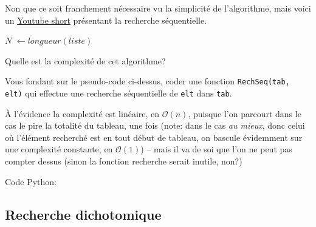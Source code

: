\documentclass[12pt]{article}
\begin{document}
	\begin{MaVid}
		Non que ce soit franchement nécessaire vu la simplicité de l'algorithme, mais voici un \href{https://youtu.be/D7sMvXltMiU}{Youtube short} présentant la recherche séquentielle.
	\end{MaVid}
	
	
	
	\begin{MaReponse}
		\begin{algorithmic}[1]
			\State $N$ $\leftarrow longueur(liste)$
			\State{}
			\EndIf
			\EndFor
			\State{}
			\EndFunction
		\end{algorithmic}
	\end{MaReponse}
		
	\begin{MonExo}
		\begin{alphenum}
			\item Quelle est la complexité de cet algorithme?
			\item Vous fondant sur le pseudo-code ci-dessus, coder une fonction \texttt{RechSeq(tab, elt)} qui effectue une recherche séquentielle de \texttt{elt} dans \texttt{tab}.
		\end{alphenum}
	\end{MonExo}
	\begin{MaReponse}
		\begin{alphenum}
			\item À l'évidence la complexité est linéaire, en $\mathcal{O}(n)$, puisque l'on parcourt dans le cas le pire la totalité du tableau, une fois (note: dans le cas \textit{au mieux}, donc celui où l'élément recherché est en tout début de tableau, on bascule évidemment sur une complexité constante, en $\mathcal{O}(1)$) -- mais il va de soi que l'on ne peut pas compter dessus (sinon la fonction recherche serait inutile, non?)
			\item Code Python:			
			\MonPython{010_RechSeq.py}
		\end{alphenum}
	\end{MaReponse}
	
	\subsection{Recherche dichotomique}
\end{document}
